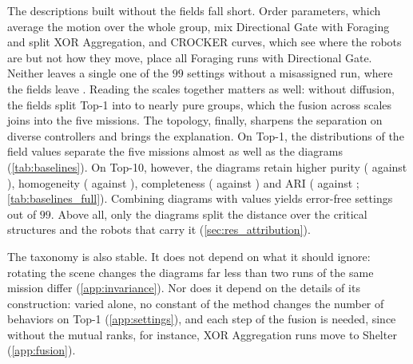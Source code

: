 \documentclass[pdflatex,sn-apa]{sn-jnl}
\begin{document}
\begin{table}[!htb]
\centering
\caption{Descriptions of the $250$ runs of Top-1 under the same fusion, affinity propagation and modal consensus (Top-10
in \cref{tab:baselines_full}); the method is shaded. $^{*}$Partition published for the same runs, with five fixed
clusters \citep{legarda2026universal}.}
\label{tab:baselines}
\end{table}

The descriptions built without the fields fall short. Order parameters, which average the motion over the whole group,
mix Directional Gate with Foraging and split XOR Aggregation, and CROCKER curves, which see where the robots are but not how
they move, place all Foraging runs with Directional Gate. Neither leaves a single one of the $99$
settings without a misassigned run, where the fields leave . Reading the scales together matters as well: without
diffusion, the fields split Top-1 into  to  nearly pure groups,
which the fusion across scales joins into the five missions. The topology, finally, sharpens the separation on diverse controllers and brings the explanation. On Top-1, the
distributions of the field values separate the five missions almost as well as the diagrams (\cref{tab:baselines}). On
Top-10, however, the diagrams retain higher purity ( against ),
homogeneity ( against ), completeness (
against ) and ARI ( against ;
\cref{tab:baselines_full}). Combining diagrams with values yields  error-free settings out
of $99$. Above all, only the diagrams split the distance over the critical structures and the robots that carry it
(\cref{sec:res_attribution}).

The taxonomy is also stable. It does not depend on what it should ignore: rotating the scene changes the diagrams far
less than two runs of the same mission differ (\cref{app:invariance}). Nor does it depend on the details of its
construction: varied alone, no constant of the method changes the number of behaviors on Top-1 (\cref{app:settings}),
and each step of the fusion is needed, since without the mutual ranks, for instance, XOR Aggregation runs move to
Shelter (\cref{app:fusion}).

\end{document}
